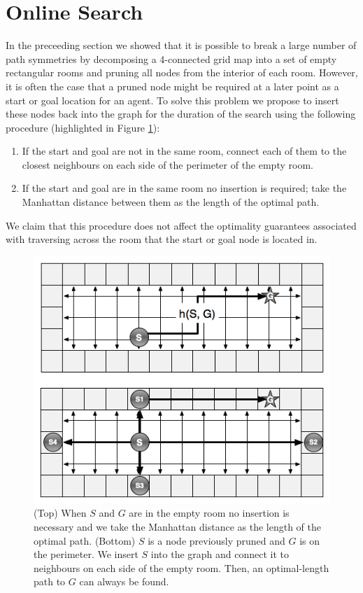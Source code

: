 \section{Online Search}
In the preceeding section we showed that it is possible to break a large 
number of path symmetries by decomposing a 4-connected grid map into 
a set of empty rectangular rooms and pruning all nodes from the interior of
each room.
However, it is often the case that a pruned node might be required at a later
point as a start or goal location for an agent.
To solve this problem we propose to insert these  nodes
back into the graph for the duration of the search using the following procedure (highlighted in Figure \ref{fig:insertion}):
\begin{enumerate}
\item{If the start and goal are not in the same room, connect each of them
to the closest neighbours on each side of the perimeter of the empty room.}
\item{If the start and goal are in the same room no insertion is required;
 take the Manhattan distance between them as the length of the optimal path. }
\end{enumerate}
We claim that this procedure  does not affect the optimality guarantees associated with traversing
across the room that the start or goal node is located in. 

\begin{figure}[t]
	\vspace{-4pt}
       \begin{center}
           \includegraphics[scale=0.50, trim = 10mm 10mm 10mm 0mm]{diagrams/roomtraversal.png}
       \end{center}
	\vspace{-3pt}
       \caption{(Top) When $S$ and $G$ are in the empty room no insertion is necessary and we take the 
				Manhattan distance as the length of the optimal path.
				(Bottom) $S$ is a node previously pruned and $G$ is on the perimeter.
				We insert $S$ into the graph and connect it to neighbours on each side of the empty room.
				Then, an optimal-length path to $G$ can always be found.}
	\label{fig:insertion}
\end{figure}

